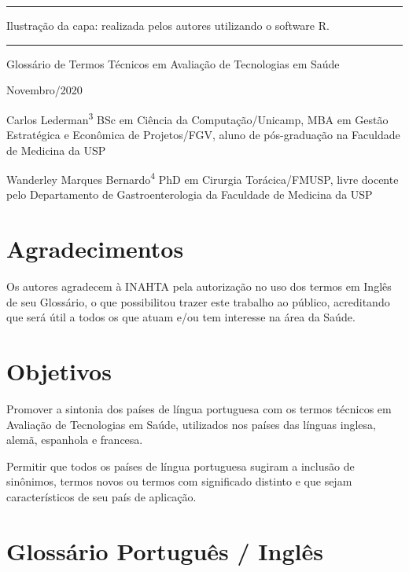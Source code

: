 \documentclass[
]{book}
\begin{document}
\begin{center}\rule{0.5\linewidth}{0.5pt}\end{center}

Ilustração da capa: realizada pelos autores utilizando o software R.

\begin{center}\rule{0.5\linewidth}{0.5pt}\end{center}

Glossário de Termos Técnicos em Avaliação de Tecnologias em Saúde

Novembro/2020

Carlos Lederman\textsuperscript{3}
BSc em Ciência da Computação/Unicamp, MBA em Gestão Estratégica e Econômica de Projetos/FGV, aluno de pós-graduação na Faculdade de Medicina da USP

Wanderley Marques Bernardo\textsuperscript{4}
PhD em Cirurgia Torácica/FMUSP, livre docente pelo Departamento de Gastroenterologia da Faculdade de Medicina da USP

\hypertarget{agradecimentos}{%
\chapter{Agradecimentos}\label{agradecimentos}}

Os autores agradecem à INAHTA pela autorização no uso dos termos em Inglês de seu Glossário, o que possibilitou trazer este trabalho ao público, acreditando que será útil a todos os que atuam e/ou tem interesse na área da Saúde.

\hypertarget{objetivos}{%
\chapter{Objetivos}\label{objetivos}}

Promover a sintonia dos países de língua portuguesa com os termos técnicos em Avaliação de Tecnologias em Saúde, utilizados nos países das línguas inglesa, alemã, espanhola e francesa.

Permitir que todos os países de língua portuguesa sugiram a inclusão de sinônimos, termos novos ou termos com significado distinto e que sejam característicos de seu país de aplicação.

\hypertarget{glossuxe1rio-portuguuxeas-ingluxeas}{%
\chapter{Glossário Português / Inglês}\label{glossuxe1rio-portuguuxeas-ingluxeas}}
\end{document}
